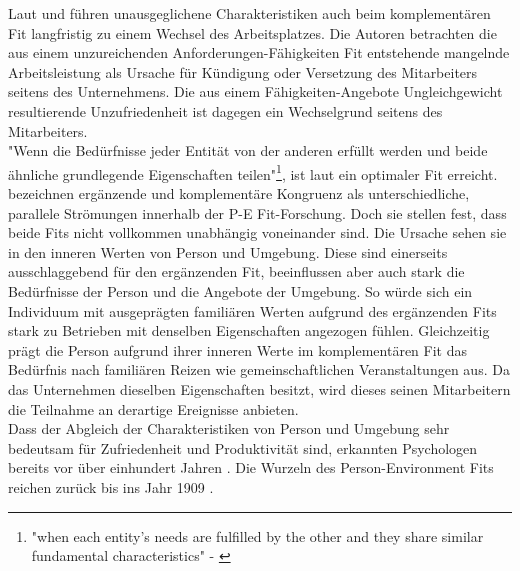 Laut \textcite[S. 9ff.]{workAdjustment:1964} und \textcite{wanous:1992} führen unausgeglichene Charakteristiken auch beim komplementären Fit langfristig zu einem Wechsel des Arbeitsplatzes. Die Autoren betrachten die aus einem unzureichenden Anforderungen-Fähigkeiten Fit entstehende mangelnde Arbeitsleistung als Ursache für Kündigung oder Versetzung des Mitarbeiters seitens des Unternehmens. Die aus einem Fähigkeiten-Angebote Ungleichgewicht resultierende Unzufriedenheit ist dagegen ein Wechselgrund seitens des Mitarbeiters.\\
"Wenn die Bedürfnisse jeder Entität von der anderen erfüllt werden und beide ähnliche grundlegende Eigenschaften teilen"\footnote{"when each entity’s needs are fulfilled by the other and they share similar fundamental characteristics" - \textcite[S. 6]{kristof:1996}}, ist laut \textcite[S. 6]{kristof:1996} ein optimaler Fit erreicht.\\
\textcite[S. 1ff.]{edwards:2004} bezeichnen ergänzende und komplementäre Kongruenz als unterschiedliche, parallele Strömungen innerhalb der P-E Fit-Forschung. Doch sie stellen fest, dass beide Fits nicht vollkommen unabhängig voneinander sind. Die Ursache sehen sie in den inneren Werten von Person und Umgebung. Diese sind einerseits ausschlaggebend für den ergänzenden Fit, beeinflussen aber auch stark die Bedürfnisse der Person und die Angebote der Umgebung. So würde sich ein Individuum mit ausgeprägten familiären Werten aufgrund des ergänzenden Fits stark zu Betrieben mit denselben Eigenschaften angezogen fühlen. Gleichzeitig prägt die Person aufgrund ihrer inneren Werte im komplementären Fit das Bedürfnis nach familiären Reizen wie gemeinschaftlichen Veranstaltungen aus. Da das Unternehmen dieselben Eigenschaften besitzt, wird dieses seinen Mitarbeitern die Teilnahme an derartige Ereignisse anbieten.\\
Dass der Abgleich der Charakteristiken von Person und Umgebung sehr bedeutsam für Zufriedenheit und Produktivität sind, erkannten Psychologen bereits vor über einhundert Jahren \cite[S. 5ff.]{parsons:1909}. Die Wurzeln des Person-Environment Fits reichen zurück bis ins Jahr 1909 \cite[S. 1]{su:2015}.

